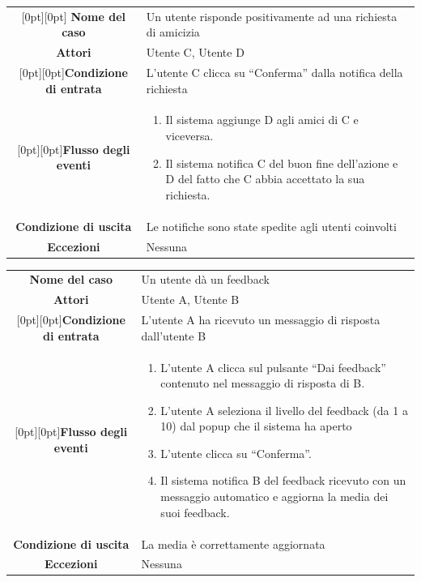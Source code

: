 \documentclass[a4paper,12pt]{article}
\begin{document}
\begin{tabularx}{\textwidth}{|c|X|}
\rowcolor[gray]{.9}\hline \raisebox{-1ex}[0pt][0pt]{ \textbf{Nome del caso}} & Un utente risponde positivamente ad una richiesta di amicizia \\
\rowcolor[gray]{.9}\hline  \textbf{Attori} & Utente C, Utente D \\ 
\rowcolor[gray]{.9}\hline  \raisebox{-1ex}[0pt][0pt]{\textbf{Condizione di entrata}} & L'utente C clicca su “Conferma” dalla notifica della richiesta \\
\rowcolor[gray]{.9}\hline  \raisebox{-5.5ex}[0pt][0pt]{\textbf{Flusso degli eventi}} & 
\begin{enumerate}
\itemsep0em 
\item Il sistema aggiunge D agli amici di C e viceversa.
\item Il sistema notifica C del buon fine dell'azione e D del fatto che C abbia accettato la sua richiesta.
\end{enumerate}
 \\ 
\rowcolor[gray]{.9}\hline  \textbf{Condizione di uscita} & Le notifiche sono state spedite agli utenti coinvolti \\
\rowcolor[gray]{.9}\hline  \textbf{Eccezioni}& Nessuna
\\
\hline 
\end{tabularx}
\clearpage
\begin{tabularx}{\textwidth}{|c|X|}
\rowcolor[gray]{.9}\hline  \textbf{Nome del caso} & Un utente dà un feedback \\
\rowcolor[gray]{.9}\hline  \textbf{Attori} & Utente A, Utente B \\ 
\rowcolor[gray]{.9}\hline  \raisebox{-1ex}[0pt][0pt]{\textbf{Condizione di entrata}} & L'utente A ha ricevuto un messaggio di risposta dall'utente B \\
\rowcolor[gray]{.9}\hline  \raisebox{-12ex}[0pt][0pt]{\textbf{Flusso degli eventi}} & 
\begin{enumerate}
\itemsep0em 
\item L'utente A clicca sul pulsante “Dai feedback” contenuto nel messaggio di risposta di B.
\item L'utente A seleziona il livello del feedback (da 1 a 10) dal popup che il sistema ha aperto
\item L'utente clicca su “Conferma”.
\item Il sistema notifica B del feedback ricevuto con un messaggio automatico e aggiorna la media dei suoi feedback.
\end{enumerate}
 \\ 
\rowcolor[gray]{.9}\hline  \textbf{Condizione di uscita} & La media è correttamente aggiornata \\
\rowcolor[gray]{.9}\hline  \textbf{Eccezioni} & Nessuna
\\
\hline 
\end{tabularx} \\[1\baselineskip]
\end{document}
